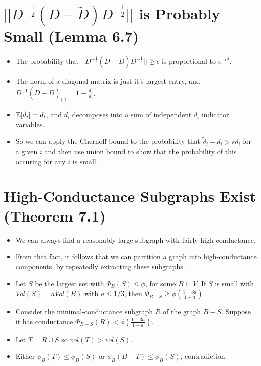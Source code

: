 \documentclass[11pt]{article}
\begin{document}
\section{\(||D^{-\frac12}(D-\tilde{D}) D^{-\frac12}||\) is Probably Small (Lemma 6.7)}
\label{sec:org6f32804}
\begin{itemize}
\item The probability that \(||D^{-\frac12}(D-\tilde{D})D^{-\frac12}|| \ge \epsilon\) is proportional to \(e^{-\epsilon^2}\).
\item The norm of a diagonal matrix is just it's largest entry, and \(D^{-1}(\tilde{D}-D)_{i,i}=1-\frac{\tilde{d}_i}{d_i}\).
\item \(\mathbb{E}[\tilde{d}_i]=d_i\), and \(\tilde{d_i}\) decomposes into a sum of independent \(d_i\) indicator variables.
\item So we can apply the Chernoff bound to the probability that \(\tilde{d}_i-d_i > \epsilon d_i\) for a given \(i\) and then use union bound to show that the probability of this occuring for any \(i\) is small.
\end{itemize}
\section{High-Conductance Subgraphs Exist (Theorem 7.1)}
\label{sec:org780d229}
\begin{itemize}
\item We can always find a reasonably large subgraph with fairly high conductance.
\item From that fact, it follows that we can partition a graph into high-conductance components, by repeatedly extracting these subgraphs.
\item Let \(S\) be the largest set with \(\Phi_B(S) \le \phi\), for some \(B \subseteq V\). If \(S\) is small with \(Vol(S) = a Vol(B)\) with \(a\le 1/3\), then \(\Phi_{B-S} \ge \phi(\frac{1-3a}{1-a})\)
\item Consider the minimal-conductance subgraph \(R\) of the graph \(B-S\). Suppose it has conductance \(\Phi_{B-S}(R) < \phi (\frac{1-3a}{1-a})\).
\item Let \(T= R \cup S\) so \(vol(T) > vol(S)\).
\item Either \(\phi_B(T) \le \phi_B(S)\) or \(\phi_B(B-T) \le \phi_B(S)\), contradiction.
\end{itemize}
\end{document}

